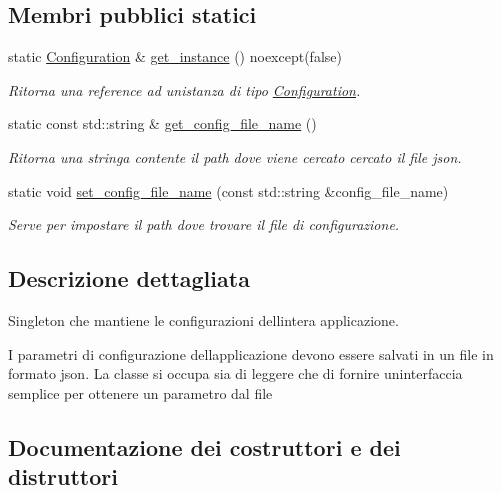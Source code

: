 \subsection*{Membri pubblici statici}
\begin{DoxyCompactItemize}
\item 
static \hyperlink{classmm_1_1_configuration}{Configuration} \& \hyperlink{classmm_1_1_configuration_a5cfc5ea56062f53ef9fbd274f6dbe79e}{get\+\_\+instance} () noexcept(false)
\begin{DoxyCompactList}\small\item\em Ritorna una reference ad un\textquotesingle{}istanza di tipo {\ttfamily \hyperlink{classmm_1_1_configuration}{Configuration}}. \end{DoxyCompactList}\item 
static const std\+::string \& \hyperlink{classmm_1_1_configuration_a631c8525beb91fb55d72eb6b58d2d68f}{get\+\_\+config\+\_\+file\+\_\+name} ()
\begin{DoxyCompactList}\small\item\em Ritorna una stringa contente il path dove viene cercato cercato il file json. \end{DoxyCompactList}\item 
static void \hyperlink{classmm_1_1_configuration_ad526b28d1a7f8c6f854352b840d2d7b4}{set\+\_\+config\+\_\+file\+\_\+name} (const std\+::string \&config\+\_\+file\+\_\+name)
\begin{DoxyCompactList}\small\item\em Serve per impostare il path dove trovare il file di configurazione. \end{DoxyCompactList}\end{DoxyCompactItemize}


\subsection{Descrizione dettagliata}
Singleton che mantiene le configurazioni dell\textquotesingle{}intera applicazione. 

I parametri di configurazione dell\textquotesingle{}applicazione devono essere salvati in un file in formato json. La classe si occupa sia di leggere che di fornire un\textquotesingle{}interfaccia semplice per ottenere un parametro dal file 

\subsection{Documentazione dei costruttori e dei distruttori}
\mbox{\label{classmm_1_1_configuration_a71e5c0e1ad7d82d6a14895a4e85d83b7}} 
